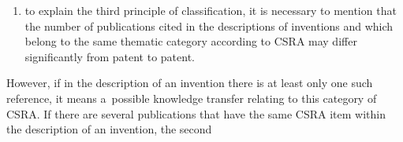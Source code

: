\begin{multicols}{2}
\begin{enumerate}[(1)]
    \item to explain the third principle of classification, it is necessary to mention 
that the number of publications cited in the descriptions of inventions and which 
belong to the same thematic category according to CSRA may differ significantly 
from patent to patent.
    \end{enumerate}
    
    However, if in the description of an invention there is at least only one such 
reference, it means a~possible knowledge transfer relating to this category of CSRA. 
If there are several publications that have the same CSRA item within the description 
of an invention, the second\linebreak\vspace*{-12pt}

\pagebreak

\end{multicols}

